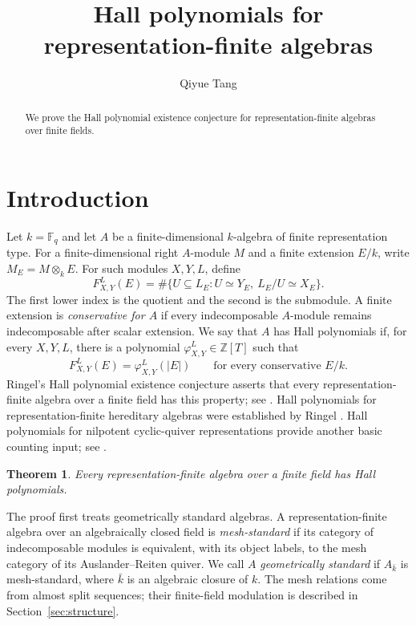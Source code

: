 \documentclass[11pt,a4paper]{article}
\title{Hall polynomials for representation-finite algebras}
\author{Qiyue Tang}
\date{}
\numberwithin{equation}{section}
\newtheorem{theorem}{Theorem}[section]
\theoremstyle{definition}
\newcommand{\FF}{\mathbb F}
\newcommand{\ZZ}{\mathbb Z}
\begin{document}
\maketitle
\begingroup\renewcommand{\thefootnote}{}
\endgroup
\begin{abstract}
We prove the Hall polynomial existence conjecture for representation-finite algebras over finite fields.
\end{abstract}

\section{Introduction}
Let $k=\FF_q$ and let $A$ be a finite-dimensional $k$-algebra of finite representation type. For a finite-dimensional right $A$-module $M$ and a finite extension $E/k$, write $M_E=M\otimes_kE$. For such modules $X,Y,L$, define
\[
F^L_{X,Y}(E)=\#\{U\subseteq L_E:U\simeq Y_E,\ L_E/U\simeq X_E\}.
\]
The first lower index is the quotient and the second is the submodule. A finite extension is \emph{conservative for $A$} if every indecomposable $A$-module remains indecomposable after scalar extension. We say that $A$ has Hall polynomials if, for every $X,Y,L$, there is a polynomial $\varphi^L_{X,Y}\in\ZZ[T]$ such that
\begin{equation}\label{eq:hall}
 F^L_{X,Y}(E)=\varphi^L_{X,Y}(|E|)
 \qquad\text{for every conservative }E/k.
\end{equation}
Ringel's Hall polynomial existence conjecture asserts that every representation-finite algebra over a finite field has this property; see \cite[\S1.1]{Fu}. Hall polynomials for representation-finite hereditary algebras were established by Ringel \cite{Ringel}. Hall polynomials for nilpotent cyclic-quiver representations provide another basic counting input; see \cite[Theorem 16]{Hubery}.

\begin{theorem}\label{thm:main}
Every representation-finite algebra over a finite field has Hall polynomials.
\end{theorem}

The proof first treats geometrically standard algebras. A representation-finite algebra over an algebraically closed field is \emph{mesh-standard} if its category of indecomposable modules is equivalent, with its object labels, to the mesh category of its Auslander--Reiten quiver. We call $A$ \emph{geometrically standard} if $A_{\bar k}$ is mesh-standard, where $\bar k$ is an algebraic closure of $k$. The mesh relations come from almost split sequences; their finite-field modulation is described in Section~\ref{sec:structure}.
\end{document}
